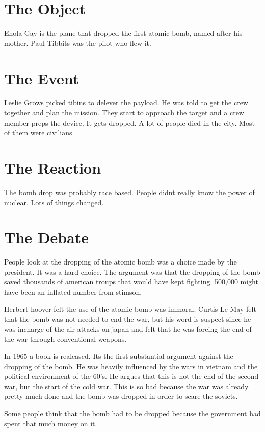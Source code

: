 \documentclass{article}
\begin{document}
\section*{The Object}
\label{sec:the_object}
Enola Gay is the plane that dropped the first atomic bomb, named after his mother. Paul Tibbits was the pilot who flew it.

\section*{The Event}
\label{sec:the_event}
Leslie Grows picked tibins to delever the payload. He was told to get the crew together and plan the mission. They start to approach the target and a crew member preps the device. It gets dropped. A lot of people died in the city. Most of them were civilians.

\section*{The Reaction}
\label{sec:the_reaction}
The bomb drop was probably race based. People didnt really know the power of nuclear. Lots of things changed.

\section*{The Debate}
\label{sec:the_debate}
People look at the dropping of the atomic bomb was a choice made by the president. It was a hard choice. The argument was that the dropping of the bomb saved thousands of american troups that would have kept fighting. 500,000 might have been an inflated number from stimson.

Herbert hoover felt the use of the atomic bomb was immoral. Curtis Le May felt that the bomb was not needed to end the war, but his word is suspect since he was incharge of the air attacks on japan and felt that he was forcing the end of the war through conventional weapons.

In 1965 a book is realeased. Its the first substantial argument against the dropping of the bomb. He was heavily influenced by the wars in vietnam and the political environment of the 60's. He argues that this is not the end of the second war, but the start of the cold war. This is so bad because the war was already pretty much done and the bomb was dropped in order to scare the soviets.

Some people think that the bomb had to be dropped because the government had spent that much money on it.
\end{document}
